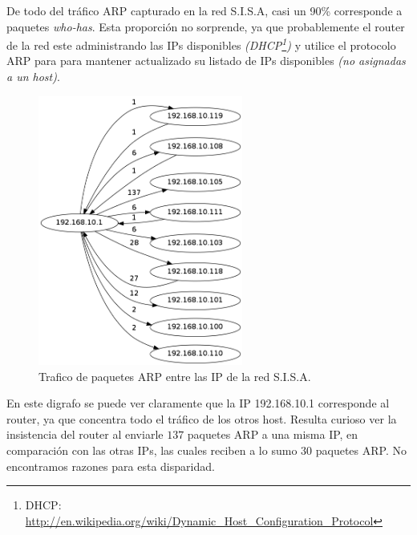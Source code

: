 De todo del tráfico ARP capturado en la red S.I.S.A, casi un 90\% corresponde a paquetes \textit{who-has}. Esta proporción no sorprende, ya que probablemente el router de la red este administrando las IPs disponibles \textit{(DHCP\footnote{DHCP: \url{http://en.wikipedia.org/wiki/Dynamic_Host_Configuration_Protocol}})} y utilice el protocolo ARP para para mantener actualizado su listado de IPs disponibles \textit{(no asignadas a un host)}.



\begin{figure}[H]
  \centering
    \includegraphics[width=0.6\textwidth]{imagenes/sisa/digrafo_sisa.png}
  \caption{Trafico de paquetes ARP entre las IP de la red S.I.S.A.}
  \label{fig:ejemplo}
\end{figure}

En este digrafo se puede ver claramente que la IP 192.168.10.1 corresponde al router, ya que concentra todo el tráfico de los otros host. Resulta curioso ver la insistencia del router al enviarle $137$ paquetes ARP a una misma IP, en comparación con las otras IPs, las cuales reciben a lo sumo $30$ paquetes ARP. No encontramos razones para esta disparidad.

\newpage